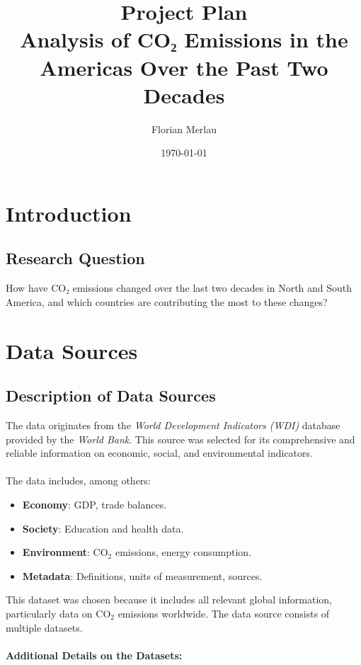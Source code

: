 \documentclass[a4paper,12pt]{article}
\title{\textbf{Project Plan}\\
\large Analysis of CO₂ Emissions in the Americas Over the Past Two Decades}
\author{Florian Merlau}
\date{\today}
\begin{document}
\maketitle

\section{Introduction}

\subsection{Research Question}

How have CO₂ emissions changed over the last two decades in North and South America, and which countries are contributing the most to these changes?

\section{Data Sources}

\subsection{Description of Data Sources}

The data originates from the \textit{World Development Indicators (WDI)} database provided by the \textit{World Bank}. This source was selected for its comprehensive and reliable information on economic, social, and environmental indicators.
\\\\
The data includes, among others:

\begin{itemize}
    \item \textbf{Economy}: GDP, trade balances.
    \item \textbf{Society}: Education and health data.
    \item \textbf{Environment}: CO$_2$ emissions, energy consumption.
    \item \textbf{Metadata}: Definitions, units of measurement, sources.
\end{itemize}

This dataset was chosen because it includes all relevant global information, particularly data on CO$_2$ emissions worldwide. The data source consists of multiple datasets.
\\\\
\textbf{Additional Details on the Datasets:}
\end{document}
